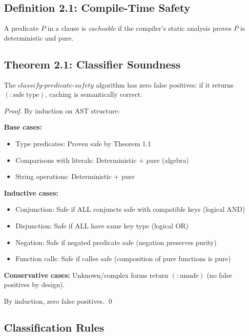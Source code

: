 \documentclass[sigplan,review,anonymous]{acmart}
\begin{document}
\subsection{Definition 2.1: Compile-Time Safety}

A predicate $P$ in a clause is \emph{cacheable} if the compiler's static analysis proves $P$ is deterministic and pure.

\subsection{Theorem 2.1: Classifier Soundness}

\begin{theorem}
The $classify\text{-}predicate\text{-}safety$ algorithm has zero false positives: if it returns $(\mathrm{:safe} \; \mathrm{type})$, caching is semantically correct.
\end{theorem}

\begin{proof}
By induction on AST structure:

\textbf{Base cases:}
\begin{itemize}
\item Type predicates: Proven safe by Theorem 1.1
\item Comparisons with literals: Deterministic + pure (algebra)
\item String operations: Deterministic + pure
\end{itemize}

\textbf{Inductive cases:}
\begin{itemize}
\item Conjunction: Safe if ALL conjuncts safe with compatible keys (logical AND)
\item Disjunction: Safe if ALL have same key type (logical OR)
\item Negation: Safe if negated predicate safe (negation preserves purity)
\item Function calls: Safe if callee safe (composition of pure functions is pure)
\end{itemize}

\textbf{Conservative cases:}
Unknown/complex forms return $(\mathrm{:unsafe})$ (no false positives by design).

By induction, zero false positives. \qed
\end{proof}

\subsection{Classification Rules}
\end{document}
